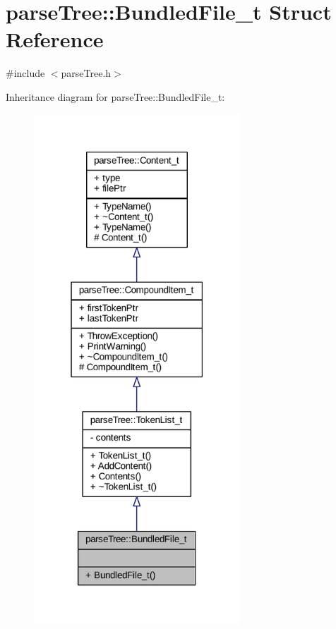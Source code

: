 \hypertarget{structparse_tree_1_1_bundled_file__t}{}\section{parse\+Tree\+:\+:Bundled\+File\+\_\+t Struct Reference}
\label{structparse_tree_1_1_bundled_file__t}


{\ttfamily \#include $<$parse\+Tree.\+h$>$}



Inheritance diagram for parse\+Tree\+:\+:Bundled\+File\+\_\+t\+:
\nopagebreak
\begin{figure}[H]
\begin{center}
\leavevmode
\includegraphics[width=219pt]{structparse_tree_1_1_bundled_file__t__inherit__graph}
\end{center}
\end{figure}


